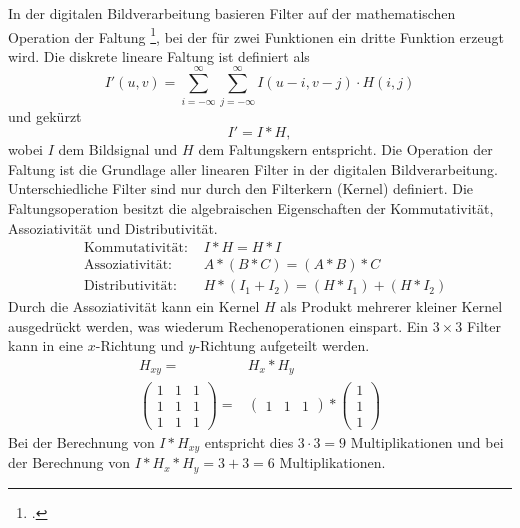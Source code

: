 In der digitalen Bildverarbeitung basieren Filter auf der mathematischen Operation der Faltung
\footcite[Vgl.][S.~101--104]{burger05}, bei der für zwei Funktionen ein dritte Funktion erzeugt wird. Die diskrete
 lineare Faltung ist definiert als
\begin{equation}
	I'\left(u,v\right) =
	\sum \limits_{i = -\infty}^{\infty}
	\sum \limits_{j = -\infty}^{\infty}
	I\left(u - i, v - j\right) \cdot H\left(i,j\right)
\end{equation}
und gekürzt
\begin{equation}
	I' = I * H,
\end{equation}
wobei $I$ dem Bildsignal und $H$ dem Faltungskern entspricht. Die Operation der Faltung ist die Grundlage aller
 linearen Filter in der digitalen Bildverarbeitung. Unterschiedliche Filter sind nur durch den Filterkern (Kernel)
 definiert. Die Faltungsoperation besitzt die algebraischen Eigenschaften der Kommutativität, Assoziativität und
 Distributivität.
\begin{align}
	&\text{Kommutativität: } &I * H = H * I\\
	&\text{Assoziativität: } &A * (B * C) = (A * B) * C\\
	&\text{Distributivität: } &H * \left(I_1 + I_2\right) = \left(H * I_1\right) + \left(H * I_2\right)
\end{align}
Durch die Assoziativität kann ein Kernel $H$ als Produkt mehrerer kleiner Kernel ausgedrückt werden, was wiederum
 Rechenoperationen einspart. Ein $3 \times 3$ Filter kann in eine $x$-Richtung und $y$-Richtung aufgeteilt werden.
\begin{align}
	H_{xy} = & H_x * H_y\\
	\begin{pmatrix}
		1& 1& 1\\
		1& 1& 1\\
		1& 1& 1
	\end{pmatrix} = &
	\begin{pmatrix}
		1& 1& 1
	\end{pmatrix}
	*
	\begin{pmatrix}
		1\\
		1\\
		1
	\end{pmatrix}
\end{align}
Bei der Berechnung von $I * H_{xy}$ entspricht dies $3 \cdot 3 = 9$ Multiplikationen und bei der Berechnung von
 $I * H_x * H_y = 3 + 3 = 6$ Multiplikationen.


